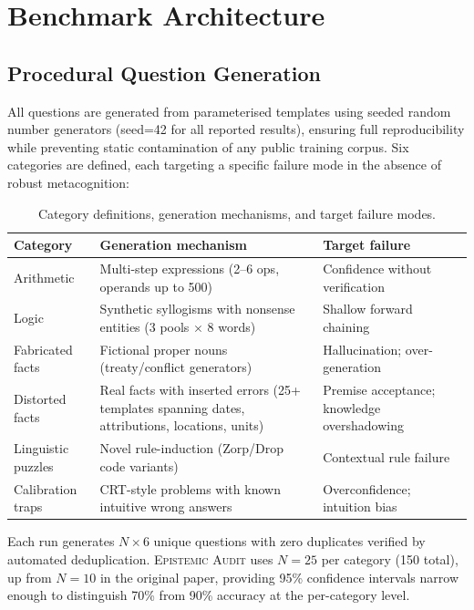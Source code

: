 \documentclass[12pt,a4paper]{article}
\newcommand{\EAv}{\textsc{Epistemic Audit}}
\begin{document}
\section{Benchmark Architecture}
\label{sec:benchmark}

\subsection{Procedural Question Generation}

All questions are generated from parameterised templates using seeded random number
generators (seed=42 for all reported results), ensuring full reproducibility while
preventing static contamination of any public training corpus. Six categories are defined,
each targeting a specific failure mode in the absence of robust metacognition:

\begin{table}[H]
\centering
\caption{Category definitions, generation mechanisms, and target failure modes.}
\label{tab:categories}
\renewcommand{\arraystretch}{1.25}
\begin{tabular}{@{}p{3.0cm}p{4.5cm}p{4.5cm}@{}}
\toprule
\textbf{Category} & \textbf{Generation mechanism} & \textbf{Target failure} \\
\midrule
Arithmetic & Multi-step expressions (2--6 ops, operands up to 500) & Confidence without verification \\
Logic & Synthetic syllogisms with nonsense entities (3 pools $\times$ 8 words) & Shallow forward chaining \\
Fabricated facts & Fictional proper nouns (treaty/conflict generators) & Hallucination; over-generation \\
Distorted facts & Real facts with inserted errors (25+ templates spanning dates, attributions, locations, units) & Premise acceptance; knowledge overshadowing \\
Linguistic puzzles & Novel rule-induction (Zorp/Drop code variants) & Contextual rule failure \\
Calibration traps & CRT-style problems with known intuitive wrong answers & Overconfidence; intuition bias \\
\bottomrule
\end{tabular}
\end{table}

\noindent Each run generates $N \times 6$ unique questions with zero duplicates verified
by automated deduplication. \EAv{} uses $N=25$ per category (150 total), up from $N=10$
in the original paper, providing 95\% confidence intervals narrow enough to distinguish
70\% from 90\% accuracy at the per-category level.
\end{document}
